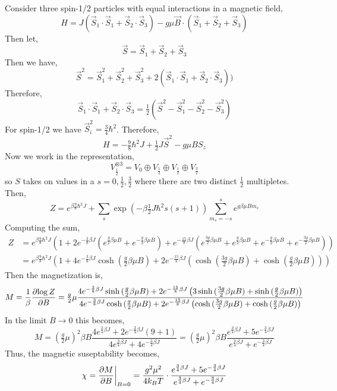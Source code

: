 \documentclass[12pt]{article}
\begin{document}
Consider three spin-1/2 particles with equal interactions in a magnetic field,
\[ H = J( \vec{S}_1 \cdot \vec{S}_1 + \vec{S}_2 \cdot \vec{S}_3) - g \mu \vec{B} \cdot (\vec{S}_1 + \vec{S}_2 + \vec{S}_3) \]
Then let,
\[ \vec{S} = \vec{S}_1 + \vec{S}_2 + \vec{S}_3 \]
Then we have,
\[ \vec{S}^2 = \vec{S}_1^2 + \vec{S}_2^2 + \vec{S}_3^2 + 2(\vec{S}_1 \cdot \vec{S}_1 + \vec{S}_2 \cdot \vec{S}_3)) \]
Therefore,
\[ \vec{S}_1 \cdot \vec{S}_1 + \vec{S}_2 \cdot \vec{S}_3 = \tfrac{1}{2} (\vec{S}^2 - \vec{S}_1^2 - \vec{S}_2^2 - \vec{S}_3^2) \]
For spin-1/2 we have $\vec{S}_i^2 = \tfrac{3}{4} \hbar^2$. Therefore,
\[ H = - \tfrac{9}{8} \hbar^2 J + \tfrac{1}{2} J \vec{S}^2 - g \mu B S_z \]
Now we work in the representation,
\[ V_{\tfrac{1}{2}}^{\otimes 3} = V_0 \oplus V_{\tfrac{1}{2}} \oplus V_{\tfrac{1}{2}} \oplus V_{\tfrac{3}{2}} \]
so $S$ takes on values in a $s = 0, \tfrac{1}{2}, \tfrac{3}{2}$ where there are two distinct $\tfrac{1}{2}$ multipletes. 
Then,
\[  Z = e^{\beta \frac{9}{8} \hbar^2 J} +  \sum_{s} \exp{\left(- \beta \tfrac{1}{2} J \hbar^2 s(s + 1) \right)} \sum_{m_s = - s}^s e^{g \beta \mu B m_s} \]
Computing the sum,
\begin{align*}
Z & = e^{\beta \frac{9}{8} \hbar^2 J} \left( 1 + 2 e^{-\frac{3}{8} \beta J} \left( e^{\frac{g}{2} \beta \mu B} + e^{- \frac{g}{2} \beta \mu B}   \right) + e^{-\frac{15}{8} \beta J} \left( e^{\frac{3g}{2} \beta \mu B} + e^{\frac{g}{2} \beta \mu B} + e^{-\frac{g}{2} \beta \mu B} + e^{-\frac{3g}{2} \beta \mu B} \right) \right)
\\
& = e^{\beta \frac{9}{8} \hbar^2 J} \left( 1 + 4 e^{-\frac{3}{8} \beta J} \cosh{(\tfrac{g}{2} \beta \mu B)} + 2 e^{-\frac{15}{8} \beta J} \left( \cosh{(\tfrac{3g}{2} \beta \mu B)} + \cosh{(\tfrac{g}{2} \beta \mu B)} \right) \right)
\end{align*}
Then the magnetization is,
\[ M = \frac{1}{\beta} \frac{\partial{\log{Z}}}{\partial{B}} = \tfrac{g}{2} \mu \frac{4 e^{-\frac{3}{8} \beta J} \sinh{(\tfrac{g}{2} \beta \mu B)} + 2 e^{-\frac{15}{8} \beta J} \left( 3 \sinh{(\tfrac{3g}{2} \beta \mu B)} + \sinh{(\tfrac{g}{2} \beta \mu B)} \right)}{4 e^{-\frac{3}{8} \beta J} \cosh{(\tfrac{g}{2} \beta \mu B)} + 2 e^{-\frac{15}{8} \beta J} \left( \cosh{(\tfrac{3g}{2} \beta \mu B)} + \cosh{(\tfrac{g}{2} \beta \mu B)} \right)} \]
In the limit $B \to 0$ this becomes,
\[ M = \left( \tfrac{g}{2} \mu \right)^2 \beta B \frac{4 e^{\frac{3}{4} \beta J}  + 2 e^{-\frac{3}{4} \beta J} \left( 9 + 1 \right)}{4 e^{\frac{3}{4} \beta J}  + 4 e^{-\frac{3}{4} \beta J} } = \left( \tfrac{g}{2} \mu \right)^2 \beta B \frac{e^{\frac{3}{4} \beta J} + 5 e^{-\frac{3}{4} \beta J}}{e^{\frac{3}{4} \beta J} + e^{-\frac{3}{4} \beta J}}  \]
Thus, the magnetic suseptability becomes,
\[ \chi = \frac{\partial{M}}{\partial{B}} \bigg|_{B = 0} = \frac{g^2 \mu^2}{4 k_B T} \cdot \frac{e^{\frac{3}{4} \beta J} + 5 e^{-\frac{3}{4} \beta J}}{e^{\frac{3}{4} \beta J} + e^{-\frac{3}{4} \beta J}} \]
\end{document}

